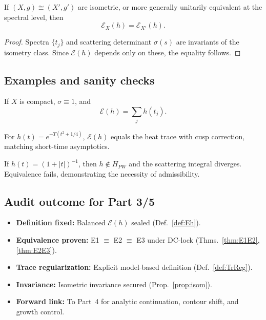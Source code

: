 \begin{proposition}
\label{prop:isom}
If $(X,g)\cong(X',g')$ are isometric, or more generally unitarily equivalent
at the spectral level, then
\[
\mathcal{E}_X(h) = \mathcal{E}_{X'}(h).
\]
\end{proposition}

\begin{proof}
Spectra $\{t_j\}$ and scattering determinant $\sigma(s)$ are invariants 
of the isometry class. Since $\mathcal{E}(h)$ depends only on these, 
the equality follows.
\end{proof}

\subsection{Examples and sanity checks}

\begin{example}
If $X$ is compact, $\sigma\equiv 1$, and 
\[
\mathcal{E}(h) = \sum_j h(t_j).
\]
\end{example}

\begin{example}
For $h(t) = e^{-T(t^2+1/4)}$, $\mathcal{E}(h)$ equals the heat trace
with cusp correction, matching short-time asymptotics.
\end{example}

\begin{counterexample}
If $h(t)=(1+|t|)^{-1}$, then $h\notin H_{PW}$ and the scattering integral diverges.  
Equivalence fails, demonstrating the necessity of admissibility.
\end{counterexample}

\subsection{Audit outcome for Part 3/5}

\begin{tcolorbox}[colback=gray!3,colframe=gray!65,title=Audit outcome — Part 3/5]
\begin{itemize}
\item \textbf{Definition fixed:} Balanced $\mathcal{E}(h)$ sealed (Def.~\ref{def:Eh}).
\item \textbf{Equivalence proven:} E1 $\equiv$ E2 $\equiv$ E3 under DC-lock (Thms.~\ref{thm:E1E2}, \ref{thm:E2E3}).
\item \textbf{Trace regularization:} Explicit model-based definition (Def.~\ref{def:TrReg}).
\item \textbf{Invariance:} Isometric invariance secured (Prop.~\ref{prop:isom}).
\item \textbf{Forward link:} To Part~4 for analytic continuation, contour shift, and growth control.
\end{itemize}
\end{tcolorbox}

